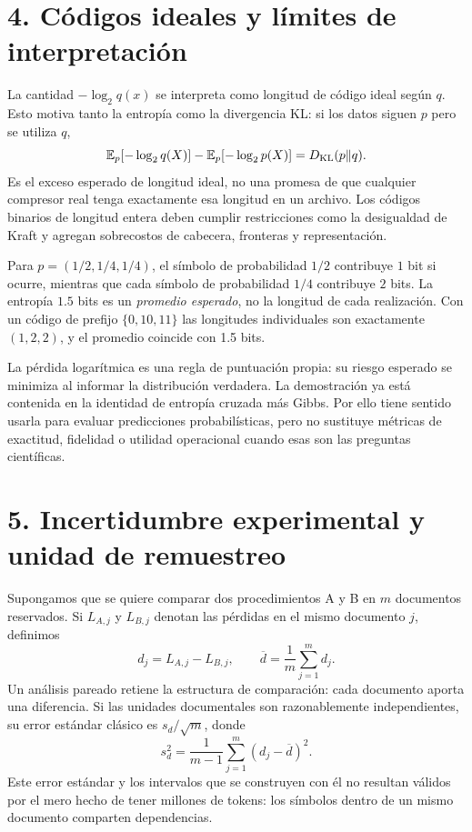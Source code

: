 \section*{4. Códigos ideales y límites de interpretación}
La cantidad $-\log_2q(x)$ se interpreta como longitud de código ideal
según $q$. Esto motiva tanto la entropía como la divergencia KL:
si los datos siguen $p$ pero se utiliza $q$,
\[
\mathbb E_p[-\log_2q(X)]-\mathbb E_p[-\log_2p(X)]
=D_{\rm KL}(p\|q).
\]
Es el exceso esperado de longitud ideal, no una promesa de que
cualquier compresor real tenga exactamente esa longitud en un archivo.
Los códigos binarios de longitud entera deben cumplir restricciones
como la desigualdad de Kraft y agregan sobrecostos de cabecera,
fronteras y representación.

\begin{ejemplo}
Para $p=(1/2,1/4,1/4)$, el símbolo de probabilidad $1/2$ contribuye
$1$ bit si ocurre, mientras que cada símbolo de probabilidad $1/4$
contribuye $2$ bits. La entropía $1.5$ bits es un \emph{promedio esperado},
no la longitud de cada realización. Con un código de prefijo
$\{0,10,11\}$ las longitudes individuales son exactamente $(1,2,2)$,
y el promedio coincide con 1.5 bits.
\end{ejemplo}

La pérdida logarítmica es una regla de puntuación propia: su riesgo
esperado se minimiza al informar la distribución verdadera.
La demostración ya está contenida en la identidad de entropía cruzada
más Gibbs. Por ello tiene sentido usarla para evaluar predicciones
probabilísticas, pero no sustituye métricas de exactitud, fidelidad o
utilidad operacional cuando esas son las preguntas científicas.

\section*{5. Incertidumbre experimental y unidad de remuestreo}
Supongamos que se quiere comparar dos procedimientos A y B en $m$
documentos reservados. Si $L_{A,j}$ y $L_{B,j}$ denotan las pérdidas
en el mismo documento $j$, definimos
\[
d_j=L_{A,j}-L_{B,j},\qquad \overline d=\frac1m\sum_{j=1}^m d_j.
\]
Un análisis pareado retiene la estructura de comparación: cada documento
aporta una diferencia. Si las unidades documentales son razonablemente
independientes, su error estándar clásico es $s_d/\sqrt m$, donde
\[
s_d^2=\frac1{m-1}\sum_{j=1}^m(d_j-\overline d)^2.
\]
Este error estándar y los intervalos que se construyen con él no
resultan válidos por el mero hecho de tener millones de tokens: los
símbolos dentro de un mismo documento comparten dependencias.


